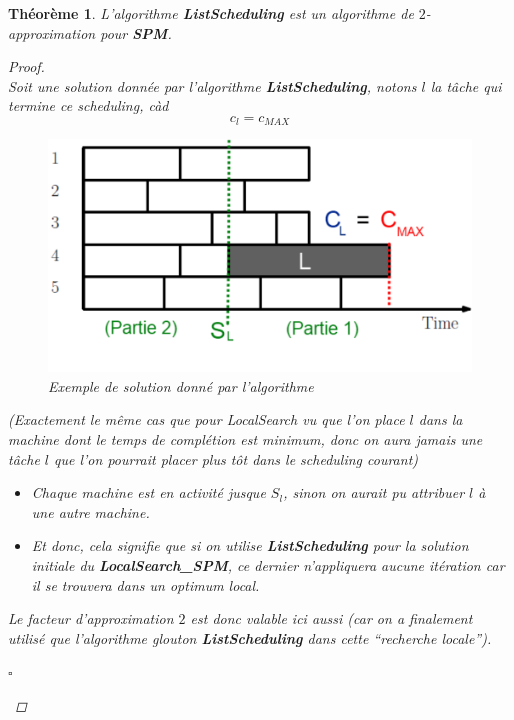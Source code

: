 \documentclass[12pt]{article}
\newcommand{\titre}[1]{\textcolor{title}{#1}}
\newcommand{\cqfd}{\begin{flushright}$\square$\end{flushright}}
\newtheorem{thm}{Th\'eor\`eme}[section]
\newtheorem{proof}{Preuve}[section]
\begin{document}
\begin{thm} L'algorithme \textbf{ListScheduling} est un algorithme de $2$-approximation pour \textbf{\titre{SPM}}.
\begin{proof}$ $\\
Soit une solution donnée par l'algorithme \textbf{ListScheduling}, notons $l$ la tâche qui termine ce scheduling, càd $$c_l = c_{MAX}$$

\begin{figure}[h!]
    \begin{center}
    \includegraphics[scale=0.45]{spm4.pdf}
    \caption{Exemple de solution donné par l'algorithme}
    \end{center}
\end{figure}

\noindent (Exactement le même cas que pour LocalSearch vu que l'on place $l$ dans la
machine dont le temps de complétion est minimum, donc on aura jamais une tâche
$l$ que l'on pourrait placer plus tôt dans le scheduling courant)

\noindent \begin{itemize}
\item[$\Rightarrow$] Chaque machine est en activité jusque $S_l$, sinon on aurait pu
attribuer $l$ à une autre machine.
\item[$\Rightarrow$] Et donc, cela signifie que si on utilise \textbf{ListScheduling} pour la
solution initiale du \textbf{LocalSearch\_SPM}, ce dernier n'appliquera aucune itération car il se trouvera dans un optimum local. \\
\end{itemize}

\noindent Le facteur d'approximation $2$ est donc valable ici aussi (car on a finalement utilisé que l'algorithme glouton
\textbf{ListScheduling} dans cette ``recherche locale'').
\cqfd
\end{proof}
\end{thm}
\end{document}
